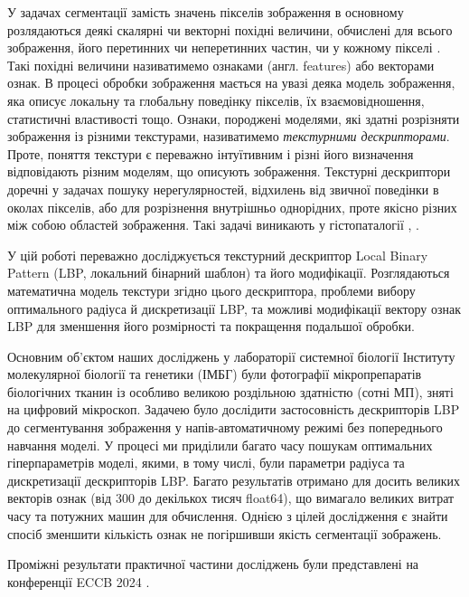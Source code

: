 У задачах сегментації замість значень пікселів зображення в основному розлядаються деякі скалярні чи векторні похідні величини,
обчислені для всього зображення, його перетинних чи неперетинних частин, чи у кожному пікселі \cite{belsare2015, simon2018, esteva2017}. 
Такі похідні величини називатимемо ознаками (англ. features) або векторами ознак.
В процесі обробки зображення мається на увазі деяка модель зображення, яка описує локальну та глобальну поведінку пікселів, їх взаємовідношення, статистичні властивості тощо.
Ознаки, породжені моделями, які здатні розрізняти зображення із різними текстурами, називатимемо \emph{текстурними дескрипторами}.
Проте, поняття текстури є переважно інтуїтивним і різні його визначення відповідають різним моделям, що описують зображення.  
Текстурні дескриптори доречні у задачах пошуку нерегулярностей, відхилень від звичної поведінки в околах пікселів, 
або для розрізнення внутрішньо однорідних, проте якісно різних між собою областей зображення. 
Такі задачі виникають у гістопаталогії \cite{simon2018}, .

У цій роботі переважно досліджується текстурний дескриптор Local Binary Pattern (LBP, локальний бінарний шаблон) \cite{ojala2002} та його модифікації.
Розглядаються математична модель текстури згідно цього дескриптора, проблеми вибору оптимального радіуса й дискретизації LBP, 
та можливі модифікації вектору ознак LBP для зменшення його розмірності та покращення подальшої обробки.

Основним об'єктом наших досліджень у лабораторії системної біології Інституту молекулярної біології та генетики (ІМБГ) були 
фотографії мікропрепаратів біологічних тканин із особливо великою роздільною здатністю (сотні МП), зняті на цифровий мікроскоп.
Задачею було дослідити застосовність дескрипторів LBP до сегментування зображення у напів-автоматичному режимі без попереднього навчання моделі.
У процесі ми приділили багато часу пошукам оптимальних гіперпараметрів моделі, якими, в тому числі, були параметри радіуса та дискретизації дескрипторів LBP.
Багато результатів отримано для досить великих векторів ознак (від 300 до декількох тисяч float64), що вимагало великих витрат часу та потужних машин для обчислення.
Однією з цілей дослідження є знайти спосіб зменшити кількість ознак не погіршивши якість сегментації зображень.

Проміжні результати практичної частини досліджень були представлені на конференції ECCB 2024 \cite{fastlbp2024}.
